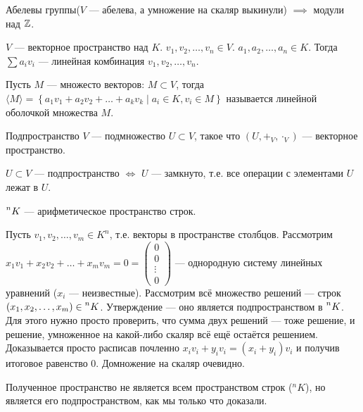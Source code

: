 \begin{remark}
	Абелевы группы($V$ --- абелева, а умножение на скаляр выкинули) $\implies$ модули над  $\mathbb{Z}$.
\end{remark}
\begin{definition}
    $V$ --- векторное пространство над  $K$. $v_1, v_2, \ldots, v_n \in V$. $a_1, a_2, \ldots, a_n \in K$. Тогда $\sum a_i v_i$ --- линейная комбинация  $v_1, v_2, \ldots, v_n$.
\end{definition}
\begin{definition}
    Пусть $M$ --- множесто векторов: $M \subset V$, тогда $\langle M \rangle = \left\{ a_1v_1 + a_2v_2 + \ldots + a_k v_k \mid a_i \in K, v_i \in M\right\}$ называется линейной оболочкой множества $M$.
\end{definition}
\begin{definition}
    Подпространство $V$ --- подмножество  $U \subset V$, такое что  $(U, +_V, \cdot_V)$ --- векторное пространство. 
\end{definition}
\begin{statement}
    $U \subset V$ --- подпространство  $\iff$ $U$ --- замкнуто, т.е. все операции с элементами  $U$ лежат в $U$.
\end{statement}
\begin{example}
    $\prescript{n}{}{K}$ --- арифметическое пространство строк.

    Пусть $v_1, v_2, \ldots, v_m \in K^n$, т.е. векторы в пространстве столбцов. Рассмотрим $x_1v_1+x_2v_2+\ldots+x_mv_m = 0 = \begin{pmatrix} 0 \\ 0 \\ \vdots \\ 0 \end{pmatrix}$ --- однородную систему линейных уравнений ($x_i$ --- неизвестные). Рассмотрим всё множество решений --- строк $(x_1, x_2, \ldots, x_m) \in \prescript{n}{}{K}$. Утверждение --- оно является подпространством в $\prescript{n}{}{K}$. Для этого нужно просто проверить, что сумма двух решений --- тоже решение, и решение, умноженное на какой-либо скаляр всё ещё остаётся решением. Доказывается просто расписав почленно $x_i v_i + y_i v_i = (x_i + y_i) v_i$ и получив итоговое равенство 0. Домножение на скаляр очевидно. 

    Полученное пространство не является всем пространством строк (${}^n K$), но является его подпространством, как мы только что доказали.
\end{example}
\slashn

